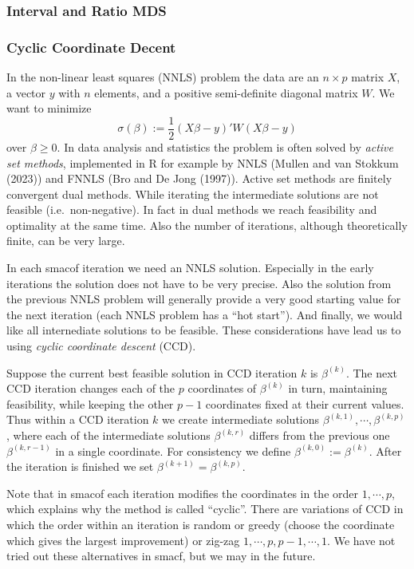\documentclass[
  12pt,
]{article}
\begin{document}
\subsubsection{Interval and Ratio MDS}\label{interval-and-ratio-mds}

\subsubsection{Cyclic Coordinate Decent}\label{cyclic-coordinate-decent}

In the non-linear least squares (NNLS) problem the data are an
\(n\times p\) matrix \(X\), a vector \(y\) with \(n\) elements, and a positive
semi-definite diagonal matrix \(W\). We want to minimize \[
\sigma(\beta):=\frac12(X\beta-y)'W(X\beta-y)
\] over \(\beta\geq 0\). In data analysis and statistics the problem is
often solved by \emph{active set methods}, implemented in R for example by
NNLS (Mullen and van Stokkum (2023)) and FNNLS (Bro and De Jong (1997)). Active set
methods are finitely convergent dual methods. While iterating the
intermediate solutions are not feasible (i.e.~non-negative). In fact in
dual methods we reach feasibility and optimality at the same time. Also
the number of iterations, although theoretically finite, can be very
large.

In each smacof iteration we need an NNLS solution. Especially in the
early iterations the solution does not have to be very precise. Also the
solution from the previous NNLS problem will generally provide a very
good starting value for the next iteration (each NNLS problem has a ``hot
start''). And finally, we would like all internediate solutions to be
feasible. These considerations have lead us to using \emph{cyclic coordinate
descent} (CCD).

Suppose the current best feasible solution in CCD iteration \(k\) is
\(\beta^{(k)}\). The next CCD iteration changes each of the \(p\)
coordinates of \(\beta^{(k)}\) in turn, maintaining feasibility, while
keeping the other \(p-1\) coordinates fixed at their current values. Thus
within a CCD iteration \(k\) we create intermediate solutions
\(\beta^{(k,1)},\cdots,\beta^{(k,p)}\), where each of the intermediate
solutions \(\beta^{(k,r)}\) differs from the previous one
\(\beta^{(k,r-1)}\) in a single coordinate. For consistency we define
\(\beta^{(k,0)}:=\beta^{(k)}\). After the iteration is finished we set
\(\beta^{(k+1)}=\beta^{(k,p)}\).

Note that in smacof each iteration modifies the coordinates in the order
\(1,\cdots,p\), which explains why the method is called ``cyclic''. There
are variations of CCD in which the order within an iteration is random
or greedy (choose the coordinate which gives the largest improvement) or
zig-zag \(1,\cdots,p,p-1,\cdots,1\). We have not tried out these
alternatives in smacf, but we may in the future.
\end{document}
